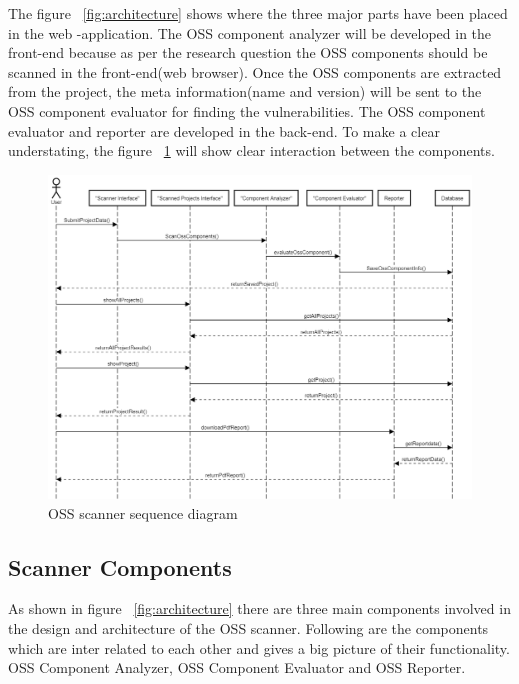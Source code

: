 \newpage
The figure ~\ref{fig:architecture} shows where the three major parts have been placed in the web -application. The \acs{OSS} component analyzer will be developed in the front-end because as per the research question the \acs{OSS} components should be scanned in the front-end(web browser). Once the \acs{OSS} components are extracted from the project, the meta information(name and version) will be sent to the \acs{OSS} component evaluator for finding the vulnerabilities. The OSS component evaluator and reporter are developed in the back-end. To make a clear understating, the figure ~\ref{fig:sequence} will show clear interaction between the components.
\begin{figure}[h!]
	\includegraphics[width=15cm]{includes/sequence_diagram.png}
	\centering
	\caption{\acs{OSS} scanner sequence diagram}
	\label{fig:sequence}
\end{figure} 
\subsection{Scanner Components}

As shown in figure ~\ref{fig:architecture} there are three main components involved in the design and architecture of the \acs{OSS} scanner. Following are the components which are inter related to each other and gives a big picture of their functionality. \acs{OSS} Component Analyzer, \acs{OSS} Component Evaluator and \acs{OSS} Reporter.

